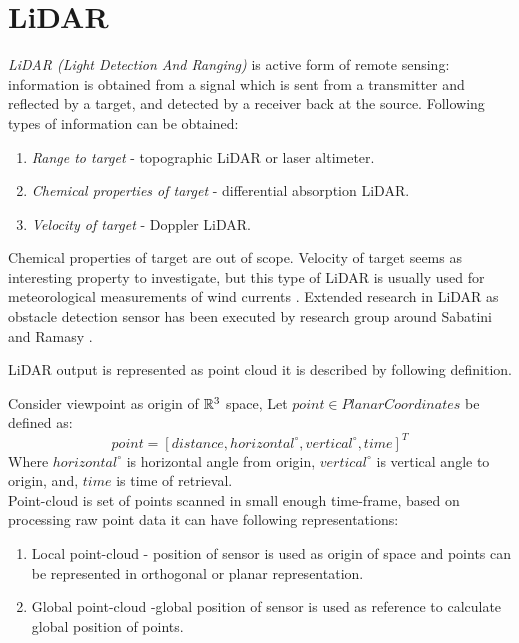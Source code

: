 \section{LiDAR}\label{sec:LiDARStateOfArt}
\noindent \emph{LiDAR (Light Detection And Ranging)} is active form of remote sensing: information is obtained from a signal which is sent from a transmitter and reflected by a target, and detected by a receiver back at the source. Following types of information can be obtained:
\begin{enumerate}
\item \textit{Range to target} - topographic LiDAR or laser altimeter.
\item \textit{Chemical properties of target} - differential absorption LiDAR.
\item \textit{Velocity of target} - Doppler LiDAR.
\end{enumerate}

\noindent Chemical properties of target are out of scope. Velocity of  target seems as interesting property to investigate, but this type of LiDAR is usually used for meteorological measurements of wind currents \cite{martin2011meteorological}. Extended research in LiDAR as obstacle detection sensor has been executed by research group around Sabatini \cite{sabatini2014lidar} and Ramasy \cite{ramasamy2016lidar}. 

LiDAR output is represented as point cloud it is described by following definition.
\begin{definition}
Consider viewpoint as origin of $\mathbb{R}^3$ space,  Let  $point \in Planar Coordinates$ be defined as:
    \begin{equation}
        point = [ distance, horizontal^\circ, vertical^\circ, time ]^T
    \end{equation}
    Where $horizontal^\circ$ is horizontal angle from origin, $vertical^\circ$ is vertical angle to origin, and, $time$ is time of retrieval.\\

    \noindent Point-cloud is set of points scanned in small enough time-frame, based on processing raw point data it can have following representations:
    
    \begin{enumerate}
        \item Local point-cloud - position of sensor is used as origin of space and points can be represented in orthogonal or planar representation. 
        
        \item Global point-cloud -global position of sensor is used as reference to calculate global position of points.
    \end{enumerate}
\end{definition}

